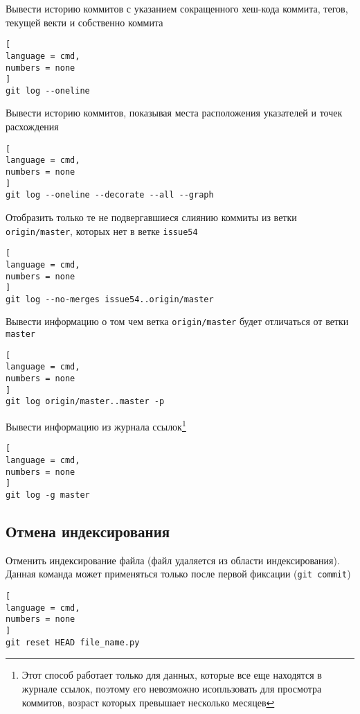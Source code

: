 \documentclass[%
	11pt,
	a4paper,
	utf8,
		]{article}
\begin{document}
Вывести историю коммитов с указанием сокращенного хеш-кода коммита, тегов, текущей векти и собственно коммита

\begin{lstlisting}[
language = cmd,
numbers = none
]
git log --oneline
\end{lstlisting}


Вывести историю коммитов, показывая места расположения указателей и точек расхождения

\begin{lstlisting}[
language = cmd,
numbers = none
]
git log --oneline --decorate --all --graph
\end{lstlisting}

Отобразить только те не подвергавшиеся слиянию коммиты из ветки \texttt{origin/master}, которых нет в ветке \texttt{issue54}

\begin{lstlisting}[
language = cmd,
numbers = none
]
git log --no-merges issue54..origin/master
\end{lstlisting}

Вывести информацию о том чем ветка \texttt{origin/master} будет отличаться от ветки \texttt{master}

\begin{lstlisting}[
language = cmd,
numbers = none
]
git log origin/master..master -p
\end{lstlisting}

Вывести информацию из журнала ссылок\footnote{Этот способ работает только для данных, которые все еще находятся в журнале ссылок, поэтому его невозможно исопльзовать для просмотра коммитов, возраст которых превышает несколько месяцев}

\begin{lstlisting}[
language = cmd,
numbers = none
]
git log -g master
\end{lstlisting}


\subsection{Отмена индексирования}

Отменить индексирование файла (файл удаляется из области индексирования). Данная команда может применяться только после первой фиксации (\texttt{git commit})

\begin{lstlisting}[
language = cmd,
numbers = none
]
git reset HEAD file_name.py
\end{lstlisting}
\end{document}
